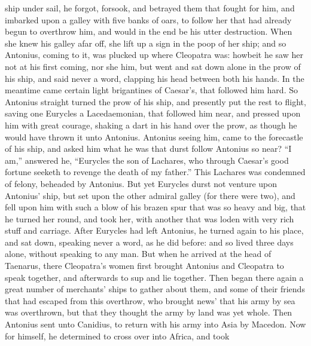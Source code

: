 \documentclass{book}
\begin{document}
ship under sail, he forgot, forsook, and betrayed them that fought for
him, and imbarked upon a galley with five banks of oars, to follow her
that had already begun to overthrow him, and would in the end be his
utter destruction.
When she knew his galley afar off, she lift up a sign in the poop
of her ship; and so Antonius, coming to it, was plucked up where Cleopatra
was: howbeit he saw her not at his first coming, nor she him, but went and sat
down alone in the prow of his ship, and said never a word, clapping his head
between both his hands. In the meantime came certain light brigantines of
Caesar's, that followed him hard. So Antonius straight turned the prow of his
ship, and presently put the rest to flight, saving one Eurycles a
Lacedaemonian, that followed him near, and pressed upon him with great
courage, shaking a dart in his hand over the prow, as though he would have
thrown it unto Antonius. Antonius seeing him, came to the forecastle of his
ship, and asked him what he was that durst follow Antonius so near?
``I am,'' answered he, ``Eurycles the son of Lachares, who through Caesar's good fortune
seeketh to revenge the death of my father.'' This Lachares was condemned of
felony, beheaded by Antonius. But yet Eurycles durst not venture upon
Antonius' ship, but set upon the other admiral galley (for there were two),
and fell upon him with such a blow of his brazen spur that was so heavy and
big, that he turned her round, and took her, with another that was loden
with very rich stuff and carriage. After Eurycles had left Antonius, he
turned again to his place, and sat down, speaking never a word, as he did
before: and so lived three days alone, without speaking to any man. But when
he arrived at the head of Taenarus, there Cleopatra's women first brought
Antonius and Cleopatra to speak together, and afterwards to sup and lie
together. Then began there again a great number of merchants' ships to gather
about them, and some of their friends that had escaped from this overthrow,
who brought news' that his army by sea was overthrown, but that they thought
the army by land was yet whole. Then Antonius sent unto Canidius, to return
with his army into Asia by 
 Macedon. 
Now for himself, he determined to cross over into Af\-ri\-ca, and took
\end{document}
